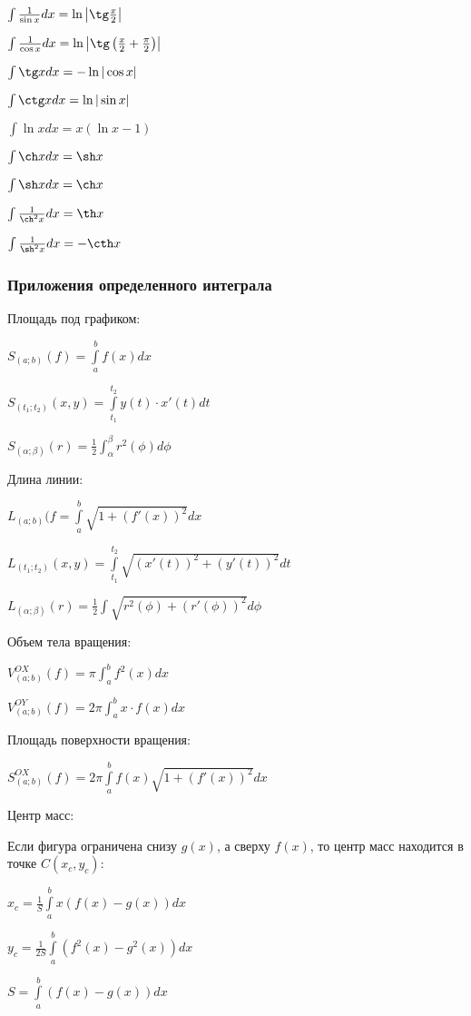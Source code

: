$ \int \frac{1}{\sin x} dx = \ln\left|\tg\frac{x}{2}\right| $

$ \int \frac{1}{\cos x} dx = \ln\left|\tg\left(\frac{x}{2} + \frac{\pi}{2}\right)\right| $

$ \int \tg x dx = -\ln|\cos x| $

$ \int \ctg x dx = \ln|\sin x| $

$ \int \ln x dx = x(\ln x -1) $

$ \int \ch x dx = \sh x $

$ \int \sh x dx = \ch x $

$ \int \frac{1}{\ch^2 x} dx = \th x $

$ \int \frac{1}{\sh^2 x} dx = -\cth x $

\subsubsection{Приложения определенного интеграла}

Площадь под графиком:

$ S_{(a; b)}(f) = \int\limits_a^b f(x) dx $

$ S_{(t_1; t_2)}(x, y) = \int\limits_{t_1}^{t_2} y(t)\cdot x'(t) dt $ 

$ S_{(\alpha; \beta)}(r) = \frac{1}{2} \int_\alpha^\beta r^2(\phi) d\phi $

Длина линии:

$ L_{(a;b)}(f = \int\limits_a^b \sqrt{1+(f'(x))^2} dx $

$ L_{(t_1; t_2)}(x, y) = \int\limits_{t_1}^{t_2} \sqrt{(x'(t))^2+(y'(t))^2} dt $

$ L_{(\alpha; \beta)}(r) = \frac{1}{2} \int \sqrt{r^2(\phi) + (r'(\phi))^2} d\phi $

Объем тела вращения:

$ V^{OX}_{(a; b)}(f) = \pi \int_a^b f^2(x) dx $

$ V^{OY}_{(a; b)}(f) = 2\pi \int_a^b x\cdot f(x) dx $

Площадь поверхности вращения:

$ S^{OX}_{(a;b)}(f) = 2\pi \int\limits_a^b f(x)\sqrt{1+(f'(x))^2} dx $

Центр масс:

Если фигура ограничена снизу $g(x)$, а сверху $f(x)$, то центр масс находится в точке $C(x_c, y_c)$:

$ x_c = \frac{1}{S} \int\limits_a^b x(f(x)-g(x)) dx $

$ y_c = \frac{1}{2S} \int\limits_a^b (f^2(x)-g^2(x)) dx $

$ S = \int\limits_a^b (f(x)-g(x)) dx  $

